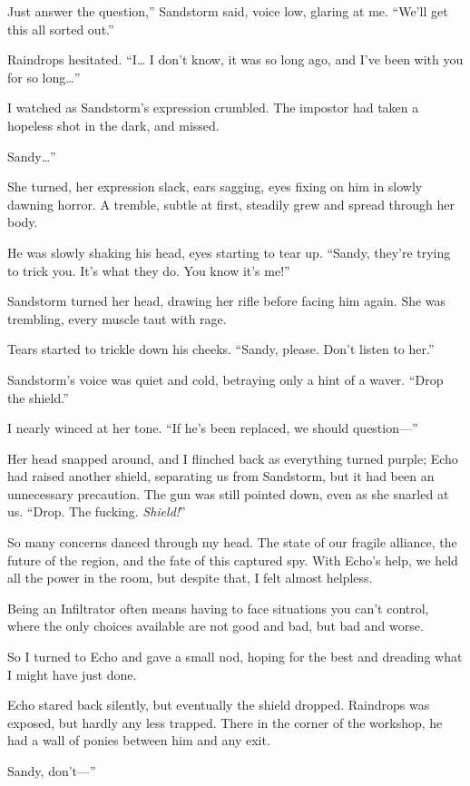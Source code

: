 \leavevmode{}Just answer the question,” Sandstorm said, voice low, glaring at me. “We’ll get this all sorted out.”

Raindrops hesitated. “I… I don’t know, it was so long ago, and I’ve been with you for so long…”

I watched as Sandstorm’s expression crumbled. The impostor had taken a hopeless shot in the dark, and missed.

\leavevmode{}Sandy…”

She turned, her expression slack, ears sagging, eyes fixing on him in slowly dawning horror. A tremble, subtle at first, steadily grew and spread through her body.

He was slowly shaking his head, eyes starting to tear up. “Sandy, they’re trying to trick you. It’s what they do. You know it’s me!”

Sandstorm turned her head, drawing her rifle before facing him again. She was trembling, every muscle taut with rage.

Tears started to trickle down his cheeks. “Sandy, please. Don’t listen to her.”

Sandstorm’s voice was quiet and cold, betraying only a hint of a waver. “Drop the shield.”

I nearly winced at her tone. “If he’s been replaced, we should question—”

Her head snapped around, and I flinched back as everything turned purple; Echo had raised another shield, separating us from Sandstorm, but it had been an unnecessary precaution. The gun was still pointed down, even as she snarled at us. “Drop. The fucking. \textit{Shield!}”

So many concerns danced through my head. The state of our fragile alliance, the future of the region, and the fate of this captured spy. With Echo’s help, we held all the power in the room, but despite that, I felt almost helpless.

Being an Infiltrator often means having to face situations you can’t control, where the only choices available are not good and bad, but bad and worse.

So I turned to Echo and gave a small nod, hoping for the best and dreading what I might have just done.

Echo stared back silently, but eventually the shield dropped. Raindrops was exposed, but hardly any less trapped. There in the corner of the workshop, he had a wall of ponies between him and any exit.

\leavevmode{}Sandy, don’t—”

